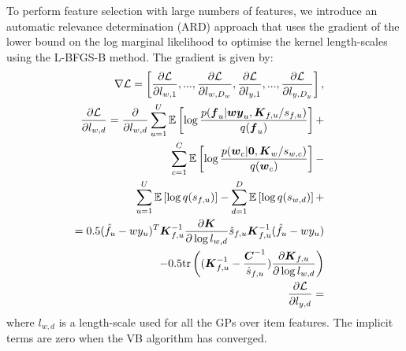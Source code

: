 To perform feature selection with large numbers of features, we introduce 
an automatic relevance determination
(ARD) approach that uses the gradient of the lower bound on the log marginal likelihood to optimise the kernel length-scales using the L-BFGS-B method\cite{??}. The gradient is given by:
\begin{eqnarray}
\nabla\mathcal{L} = \left[ \frac{\partial \mathcal{L}}{\partial l_{w,1}}, ...,  \frac{\partial \mathcal{L}}{\partial l_{w,D_w}},  \frac{\partial \mathcal{L}}{\partial l_{y,1}}, ...,  \frac{\partial \mathcal{L}}{\partial l_{y,D_y}} \right], &&\\
\frac{\partial \mathcal{L}}{\partial l_{w,d}} = \frac{\partial}{\partial l_{w,d}} 
\sum_{u=1}^U  \mathbb{E}\left[\log\frac{p(\boldsymbol f_u | \boldsymbol w \boldsymbol y_u, \boldsymbol K_{f,u} / s_{f,u} )}{q(\boldsymbol f_u)}\right] + \nonumber && \\
\sum_{c=1}^C \mathbb{E}\left[\log\frac{p(\boldsymbol w_c | \boldsymbol 0, \boldsymbol K_w / s_{w,c} ) }{q(\boldsymbol w_c) } \right] - \nonumber&&\\
\sum_{u=1}^U \mathbb{E}\left[\log q(s_{f,u})\right] - \sum_{d=1}^D \mathbb{E}\left[\log q(s_{w,d})\right] +\nonumber&&\\
= 0.5 (\hat{f}_u - wy_u)^T \boldsymbol K_{f,u}^{-1} \frac{\partial \boldsymbol K}{\partial \log l_{w,d}} \hat{s}_{f,u} \boldsymbol K_{f,u}^{-1} (\hat{f}_u - wy_u) \nonumber\\
- 0.5\mathrm{tr}\left( (\boldsymbol K_{f,u}^{-1} - \frac{\boldsymbol C^{-1}}{\hat{s}_{f,u}} ) \frac{\partial \boldsymbol K_{f,u}}{\partial \log l_{w,d}} \right)\nonumber&&\\
\frac{\partial \mathcal{L}}{\partial l_{y,d}} = &&\\
\end{eqnarray}
where $l_{w,d}$ is a length-scale used for all the GPs over item features. The implicit terms are zero when the VB algorithm has converged.
